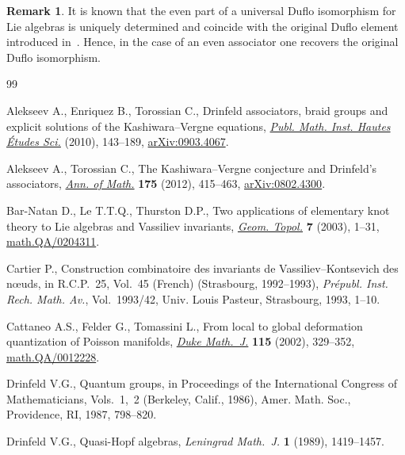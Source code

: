 \documentclass[pdftex]{sigma}
\numberwithin{equation}{section}
\theoremstyle{definition}
\newtheorem{rmk}[thm]{Remark}
\begin{document}
\begin{rmk}
It is known that the even part of a universal Duf\/lo isomorphism for Lie algebras is uniquely determined and coincide with the original Duf\/lo element introduced in~\cite{Duflo1977}. Hence, in the case of an even associator one recovers the original Duf\/lo isomorphism.
\end{rmk}

\begin{thebibliography}{99}
\footnotesize\itemsep=0pt

Alekseev A., Enriquez B., Torossian C., Drinfeld associators, braid groups and
 explicit solutions of the {K}ashiwara--{V}ergne equations, \href{http://dx.doi.org/10.1007/s10240-010-0029-4}{\textit{Publ.
 Math. Inst. Hautes \'Etudes Sci.}} (2010), 143--189, \href{http://arxiv.org/abs/0903.4067}{arXiv:0903.4067}.

Alekseev A., Torossian C., The {K}ashiwara--{V}ergne conjecture and
 {D}rinfeld's associators, \href{http://dx.doi.org/10.4007/annals.2012.175.2.1}{\textit{Ann. of Math.}} \textbf{175} (2012),
 415--463, \href{http://arxiv.org/abs/0802.4300}{arXiv:0802.4300}.

Bar-Natan D., Le T.T.Q., Thurston D.P., Two applications of elementary knot
 theory to {L}ie algebras and {V}assiliev invariants, \href{http://dx.doi.org/10.2140/gt.2003.7.1}{\textit{Geom. Topol.}}
 \textbf{7} (2003), 1--31, \href{http://arxiv.org/abs/math.QA/0204311}{math.QA/0204311}.

Cartier P., Construction combinatoire des invariants de
 {V}assiliev--{K}ontsevich des n\oe uds, in R.{C}.{P}.~25, {V}ol.~45
 ({F}rench) ({S}trasbourg, 1992--1993), \textit{Pr\'epubl. Inst. Rech. Math.
 Av.}, Vol.~1993/42, Univ. Louis Pasteur, Strasbourg, 1993, 1--10.

Cattaneo A.S., Felder G., Tomassini L., From local to global deformation
 quantization of {P}oisson manifolds, \href{http://dx.doi.org/10.1215/S0012-7094-02-11524-5}{\textit{Duke Math.~J.}} \textbf{115}
 (2002), 329--352, \href{http://arxiv.org/abs/math.QA/0012228}{math.QA/0012228}.

Drinfeld V.G., Quantum groups, in Proceedings of the {I}nternational {C}ongress
 of {M}athematicians, {V}ols.~1,~2 ({B}erkeley, {C}alif., 1986), Amer. Math.
 Soc., Providence, RI, 1987, 798--820.

Drinfeld V.G., Quasi-{H}opf algebras, \textit{Leningrad Math.~J.} \textbf{1}
 (1989), 1419--1457.


\end{thebibliography}
\end{document}
